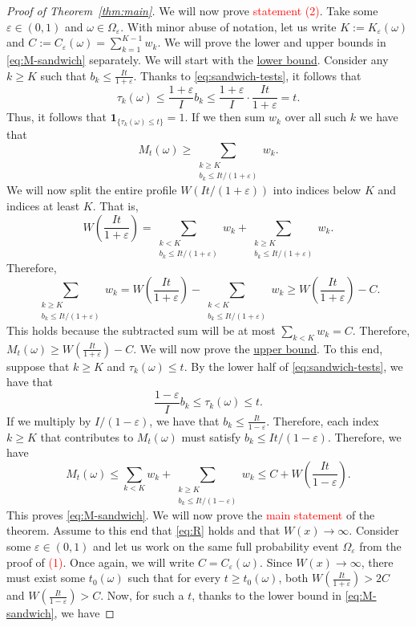 \documentclass{article}
\newcommand{\ind}[1]{\mathbf{1}_{\{#1\}}}
\theoremstyle{definition}
\begin{document}
\begin{proof}[Proof of Theorem~\ref{thm:main}]
We will now prove \textcolor{red}{statement (2)}. Take some $\varepsilon\in(0,1)$ and $\omega\in\Omega_{\varepsilon}$. With minor abuse of notation, let us write $K:=K_{\varepsilon}(\omega)$ and $C:=C_{\varepsilon}(\omega)=\sum_{k=1}^{K-1}w_k$. We will prove the lower and upper bounds in \eqref{eq:M-sandwich} separately. We will start with the \underline{lower bound}. Consider any $k\ge K$ such that $b_k\le \frac{It}{1+\varepsilon}$. Thanks to \eqref{eq:sandwich-tests}, it follows that
\[
\tau_k(\omega)\le \frac{1+\varepsilon}{I}b_k\le \frac{1+\varepsilon}{I}\cdot\frac{It}{1+\varepsilon} = t.
\]
Thus, it follows that $\ind{\tau_k(\omega)\le t}=1$. If we then sum $w_k$ over all such $k$ we have that
\[
M_t(\omega) \ge \sum_{\substack{k\ge K\\ b_k \le It/(1+\varepsilon)}} w_k.
\]
We will now split the entire profile $W(It/(1+\varepsilon))$ into indices below $K$ and indices at least $K$. That is,
\[
W\left(\frac{It}{1+\varepsilon}\right) = \sum_{\substack{k< K\\ b_k \le It/(1+\varepsilon)}} w_k + \sum_{\substack{k\ge K\\ b_k \le It/(1+\varepsilon)}} w_k.
\]
Therefore,
\[
\sum_{\substack{k\ge K\\ b_k \le It/(1+\varepsilon)}} w_k = W\left(\frac{It}{1+\varepsilon}\right)- \sum_{\substack{k< K\\ b_k \le It/(1+\varepsilon)}} w_k \ge W\left(\frac{It}{1+\varepsilon}\right) - C.
\]
This holds because the subtracted sum will be at most $\sum_{k<K}w_k=C$. Therefore, $M_t(\omega)\ge W\left(\frac{It}{1+\varepsilon}\right)-C$. We will now prove the \underline{upper bound}. To this end, suppose that $k\ge K$ and $\tau_k(\omega)\le t$. By the lower half of \eqref{eq:sandwich-tests}, we have that
\[
\frac{1-\varepsilon}{I}b_k\le \tau_k(\omega)\le t.
\]
If we multiply by $I/(1-\varepsilon)$, we have that $b_k\le \frac{It}{1-\varepsilon}$. Therefore, each index $k\ge K$ that contributes to $M_t(\omega)$ must satisfy $b_k\le It/(1-\varepsilon)$. Therefore, we have
\[
M_t(\omega) \le \sum_{k< K} w_k + \sum_{\substack{k\ge K\\ b_k \le It/(1-\varepsilon)}} w_k \le C + W\left(\frac{It}{1-\varepsilon}\right).
\]
This proves \eqref{eq:M-sandwich}. We will now prove the \textcolor{red}{main statement} of the theorem. Assume to this end that \eqref{eq:R} holds and that $W(x)\to\infty$. Consider some $\varepsilon\in(0,1)$ and let us work on the same full probability event $\Omega_{\varepsilon}$ from the proof of \textcolor{red}{(1)}. Once again, we will write $C=C_{\varepsilon}(\omega)$. Since $W(x)\to\infty$, there must exist some $t_0(\omega)$ such that for every $t\ge t_0(\omega)$, both $W\left(\frac{It}{1+\varepsilon}\right)>2C$ and $W\left(\frac{It}{1-\varepsilon}\right)>C$. Now, for such a $t$, thanks to the lower bound in \eqref{eq:M-sandwich}, we have

\end{proof}
\end{document}
